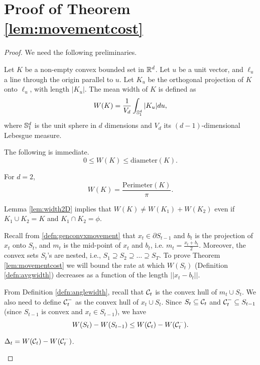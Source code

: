 \section{Proof of Theorem \ref{lem:movementcost}}
\begin{proof}
We need the following preliminaries.

 \begin{definition}\label{defn:avgwidth}
Let $K$ be a non-empty convex bounded set in ${\mathbb{R}}^d$. Let $u$ be a unit vector, and $\ell_u$ a line through the origin parallel to $u$. 
Let $K_u$ be the orthogonal projection of $K$ onto $\ell_u$, with length $|K_u|$. The mean width of $K$ is defined as 
\begin{equation}\label{eq:projlength}
W(K) = \frac{1}{V_d} \int_{{\mathbb{S}}_1^d} |K_u| du,
\end{equation}
where ${\mathbb{S}}_1^d$ is the unit sphere in $d$ dimensions and $V_d$ its $(d-1)$-dimensional Lebesgue measure.
\end{definition}


The following is immediate. 
\begin{equation}\label{eq:WBound1}
0\le W(K) \le \text{diameter}(K).
\end{equation}

\begin{lemma}\label{lem:width2D}\cite{eggleston1966convexity}
For $d=2$, $$W(K)=\frac{\text{Perimeter}(K)}{\pi}.$$
\end{lemma}
Lemma \ref{lem:width2D} implies that $W(K) \ne W(K_1) + W(K_2)$ even if $K_1\cup K_2=K$ and $K_1\cap K_2=\phi$.




Recall from \eqref{defn:genconvxmovement} that $x_t\in  \partial S_{t-1}$ and $b_t$ is the projection of $x_t$ onto $S_{t}$, and $m_t$ is the mid-point of $x_t$ and $b_t$, i.e. $m_t = \frac{x_t+b_t}{2}$. Moreover, the convex sets $S_t$'s are nested, i.e., $S_1\supseteq S_2 \supseteq \dots \supseteq S_T$.
To prove Theorem \ref{lem:movementcost} we will bound the rate at which $W(S_t)$ (Definition \ref{defn:avgwidth}) decreases as a function of the length $||x_t-b_t||$. 

From Definition \ref{defn:anglewidth}, recall that $\mathcal{C}_t$ is the convex hull of $m_t\cup S_{t}$. We also need to define $\mathcal{C}_t^-$ as the convex hull of $x_t\cup S_{t}$. Since 
$S_t \subseteq \mathcal{C}_t$ and $\mathcal{C}_t^- \subseteq S_{t-1}$ (since $S_{t-1}$ is convex and $x_t\in S_{t-1}$), we have \begin{equation}\label{eq:widthlb}
W(S_{t}) - W(S_{t-1}) \le W(\mathcal{C}_t) - W(\mathcal{C}_t^-).
\end{equation} 
\begin{definition}\label{}
$\Delta_t = W(\mathcal{C}_t) - W(\mathcal{C}_t^-)$.
\end{definition}




\end{proof}
